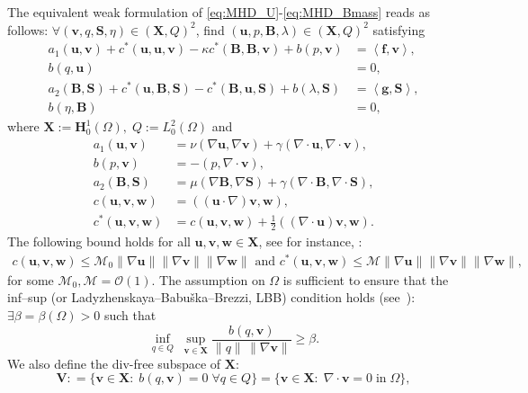 \documentclass[3p]{elsarticle}
\def\V#1{\mathbf{#1}}
\newcommand{\Mbd}{\mathcal{M}}
\begin{document}
The equivalent weak formulation of \eqref{eq:MHD_U}-\eqref{eq:MHD_Bmass} reads as follows: $\forall (\V{v},q,\V{S},\eta)\in(\V{X},Q)^2 $, find $(\V{u},p,\V{B},\lambda)\in (\V{X},Q)^2$ satisfying 
%
\begin{align}
a_1(\V{u}, \V{v})+c^*(\V{u},\V{u},\V{v})-\kappa c^*(\V{B},\V{B},\V{v})+b(p,\V{v}) & = \left<\V{f},\V{v} \right>, \label{eq:exact1}\\
b(q,\V{u}) & = 0, \label{eq:exact2} \\
a_2(\V{B}, \V{S})+c^*(\V{u},\V{B},\V{S})-c^*(\V{B},\V{u},\V{S})+b(\lambda,\V{S}) & = \left<\V{g},\V{S} \right>, \label{eq:exact3} \\
b(\eta,\V{B}) & = 0, \label{eq:exact4}
\end{align}
where $\V{X}:= \V{H}_0^1(\Omega), \; Q:=L_0^2(\Omega)$ and 
%
\begin{align*}
a_1(\V{u}, \V{v}) & = \nu(\nabla \V{u}, \nabla \V{v}) + \gamma (\nabla \cdot \V{u}, \nabla \cdot \V{v}), \\
b(p, \V{v}) & = -(p,\nabla\cdot \V{v}), \\
a_2(\V{B}, \V{S}) & = \mu(\nabla \V{B}, \nabla \V{S}) + \gamma (\nabla \cdot \V{B}, \nabla \cdot \V{S}), \\
c(\V{u},\V{v},\V{w}) &= ((\V{u}\cdot \nabla)\V{v},\V{w}), \\
c^* (\V{u},\V{v},\V{w}) &= c(\V{u},\V{v},\V{w})+\frac{1}{2}\left({(\nabla \cdot \V{u})}\V{v}, \V{w} \right).
\end{align*}
The following bound holds for all $\V{u},\V{v}, \V{w}\in \V{X}$, see for instance,
\cite{GirRav1986,Tem1979}:
\begin{eqnarray}
c(\V{u},\V{v},\V{w})\leq \mathcal{M}_0 \|\nabla \V{u}\|\|\nabla \V{v}\|\|\nabla \V{w}\| \text{ and } c^*(\V{u},\V{v},\V{w})\leq \mathcal{M} \|\nabla \V{u}\|\|\nabla \V{v}\| \|\nabla \V{w}\|, \label{eq:nnl}
\end{eqnarray}
for some $\Mbd_0, \Mbd =\mathcal{O}(1)$. 
The assumption on $\Omega$ is sufficient to ensure that the inf--sup (or Ladyzhenskaya--Babu\v{s}ka--Brezzi, LBB) condition holds (see~\cite{BofBreFor2013,BoyFab2013,GirRav1986}): $\exists \beta=\beta(\Omega) > 0$ such that
\begin{equation*}
\inf_{q \in Q} \;
\sup_{\V{v} \in \V{X}}
\frac{b(q,\V{v})}{\|q\|\, \|\nabla \V{v}\|}
\geq \beta.
\end{equation*} 
We also define the div-free subspace of $\V{X}$:
\begin{equation*}
    \V{V}: = \{ \V{v} \in \V{X}:\;  b(q,\V{v})=0 \; \forall q\in Q\} = \{ \V{v} \in \V{X}:\; \nabla \cdot  \V{v}=0 \; \text{in} \; \Omega\},
\end{equation*}
\end{document}

